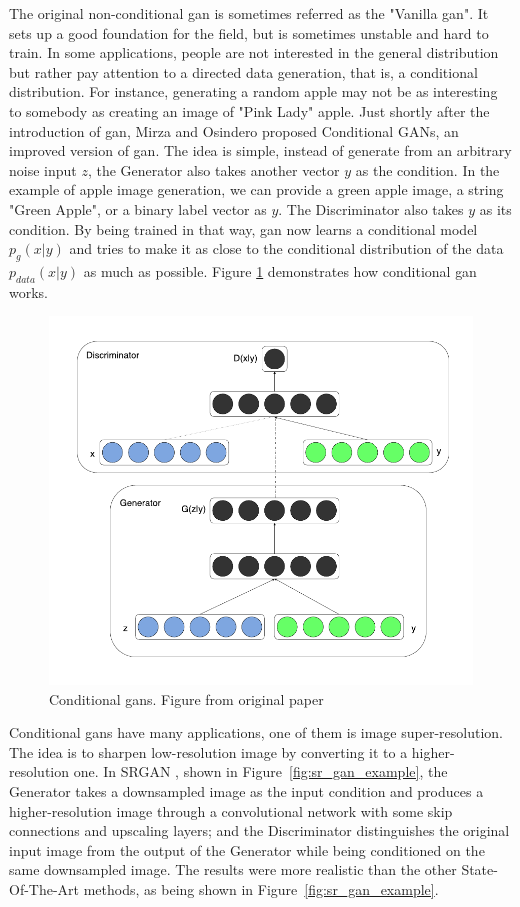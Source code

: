 The original non-conditional \acrshort{gan} is sometimes referred as the "Vanilla
\acrshort{gan}". It sets up a good foundation for the field, but is sometimes unstable and
hard to train. In some applications, people are not interested in the general distribution
but rather pay attention to a directed data generation, that is, a conditional
distribution. For instance, generating a random apple may not be as interesting to somebody
as creating an image of "Pink Lady" apple. Just shortly after the introduction of
\acrshort{gan}, Mirza and Osindero \cite{cogan} proposed Conditional GANs, an improved
version of \acrshort{gan}. The idea is simple, instead of generate from an arbitrary noise
input $z$, the Generator also takes another vector $y$ as the condition. In the example of
apple image generation, we can provide a green apple image, a string "Green Apple", or a binary
label vector as $y$. The Discriminator also takes $y$ as its condition. By being trained
in that way, \acrshort{gan} now learns a conditional model $p_{g}(x|y)$ and tries to make
it as close to the conditional distribution of the data $p_{data}(x|y)$ as much as
possible. Figure \ref{fig:co_gan_model} demonstrates how conditional \acrshort{gan} works.

\begin{figure}[h]
	\centering
	\includegraphics[width=0.5\linewidth]{img/co_gan_model}
	\caption{Conditional \acrshort{gan}s. Figure from original paper \cite{cogan}}
	\label{fig:co_gan_model}
\end{figure}

Conditional \acrshort{gan}s have many applications, one of them is image super-resolution.
The idea is to sharpen low-resolution image by converting it to a higher-resolution one.
In SRGAN \cite{sr_gan}, shown in Figure~\ref{fig:sr_gan_example}, the Generator takes a
downsampled image as the input condition and produces a higher-resolution image through a
convolutional network with some skip connections and upscaling layers; and the
Discriminator distinguishes the original input image from the output of the Generator
while being conditioned on the same downsampled image. The results were more realistic
than the other State-Of-The-Art methods, as being shown in
Figure~\ref{fig:sr_gan_example}.

